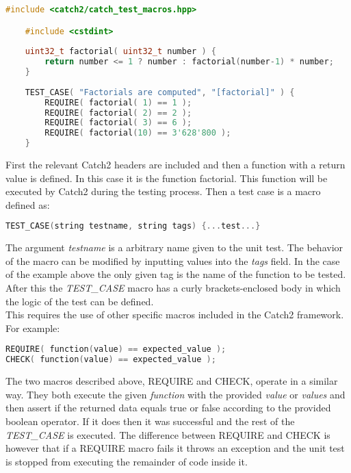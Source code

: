 \begin{minipage}{\textwidth}
\begin{lstlisting}[language=C++, caption=Example of Catch2 test definition]
    #include <catch2/catch_test_macros.hpp>

    #include <cstdint>
    
    uint32_t factorial( uint32_t number ) {
        return number <= 1 ? number : factorial(number-1) * number;
    }
    
    TEST_CASE( "Factorials are computed", "[factorial]" ) {
        REQUIRE( factorial( 1) == 1 );
        REQUIRE( factorial( 2) == 2 );
        REQUIRE( factorial( 3) == 6 );
        REQUIRE( factorial(10) == 3'628'800 );
    }
\end{lstlisting}
\end{minipage}

First the relevant Catch2 headers are included and then a function with a return value is defined. In this case it is the function factorial. 
This function will be executed by Catch2 during the testing process. Then a test case is a macro defined as:

\begin{minipage}{\textwidth}
\begin{lstlisting}[language=C++]
TEST_CASE(string testname, string tags) {...test...}
\end{lstlisting}
\end{minipage}

The argument \textit{testname} is a arbitrary name given to the unit test. The behavior of the macro can be modified by inputting values into 
the \textit{tags} field. In the case of the example above the only given tag is the name of the function to be tested. After this the \textit{TEST\_CASE} 
macro has a curly brackets-enclosed body in which the logic of the test can be defined.\\
This requires the use of other specific macros included in the Catch2 framework. For example:

\begin{minipage}{\textwidth}
\begin{lstlisting}[language=C++]
REQUIRE( function(value) == expected_value );
CHECK( function(value) == expected_value );
\end{lstlisting}
\end{minipage}

The two macros described above, REQUIRE and CHECK, operate in a similar way. They both execute the given \textit{function} with the provided \textit{value} or \textit{values}
and then assert if the returned data equals true or false according to the provided boolean operator. If it does then it was successful and the rest of the \textit{TEST\_CASE} is executed. The difference 
between REQUIRE and CHECK is however that if a REQUIRE macro fails it throws an exception and the unit test is stopped from executing the remainder of code inside it.

